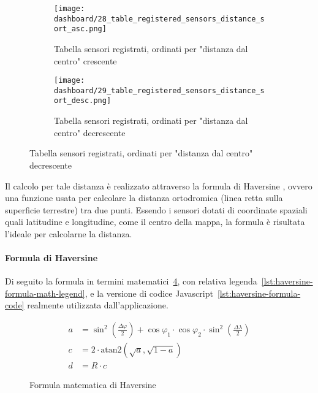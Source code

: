 \begin{figure}[H]
  \centering
  \begin{subfigure}{\textwidth}
    \centering
    \texttt{[image: dashboard/28\_table\_registered\_sensors\_distance\_sort\_asc.png]}
    \caption{Tabella sensori registrati, ordinati per "distanza dal centro" crescente}
    \label{fig:app-tab-registered-sensors-distance-sort-asc}
  \end{subfigure}

  \hfill
  \begin{subfigure}{\textwidth}
    \centering
    \texttt{[image: dashboard/29\_table\_registered\_sensors\_distance\_sort\_desc.png]}
    \caption{Tabella sensori registrati, ordinati per "distanza dal centro" decrescente}
    \label{fig:app-tab-registered-sensors-distance-sort-desc}
  \end{subfigure}
\end{figure}

Il calcolo per tale distanza è realizzato attraverso la formula di Haversine \cite{haversine_formula},
ovvero una funzione usata per calcolare la distanza ortodromica (linea retta sulla superficie terrestre) tra due punti.
Essendo i sensori dotati di coordinate spaziali quali latitudine e longitudine, come il centro della mappa,
la formula è risultata l'ideale per calcolarne la distanza.

\paragraph{Formula di Haversine}

Di seguito la formula in termini matematici~\ref{lst:haversine-formula-math},
con relativa legenda~\ref{lst:haversine-formula-math-legend}, e la versione
di codice Javascript~\ref{lst:haversine-formula-code} realmente utilizzata dall'applicazione.

\begin{figure}[h]
  \begin{align}
    a & = \sin^2\left(\frac{\Delta\varphi}{2}\right) + \cos\varphi_1 \cdot \cos\varphi_2 \cdot \sin^2\left(\frac{\Delta\lambda}{2}\right) \\
    c & = 2 \cdot \text{atan2}\left(\sqrt{a}, \sqrt{1-a}\right)                                                                           \\
    d & = R \cdot c
  \end{align}
  \caption{Formula matematica di Haversine}
  \label{lst:haversine-formula-math}
\end{figure}

